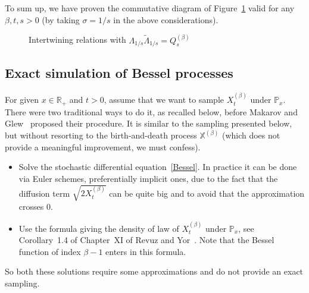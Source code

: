 \documentclass[10pt]{amsart}
\theoremstyle{definition}\newtheorem{defi}[theo]{Definition}\newtheorem{rema}[theo]{Remark}\newtheorem{exam}[theo]{Example}\newtheorem{exem}[theo]{Example}\newtheorem{nota}[theo]{Notation}
\newcommand{\cX}{{\discret X}}
\newcommand{\PP}{\mathbb{P}}
\newcommand{\RR}{\mathbb{R}}
\newcommand{\fm}{\mathfrak{m}}
\newcommand{\wi}{\widetilde}
\newcommand{\dBs}{{\discret{Q}}}
\newcommand{\Bs}{Q}
\newcommand{\esL}{\mathbf{L}}
\newcommand{\esLd}{\ell}
\newcommand{\discret}[1]{\mathds{#1}}
\begin{document}
To sum up, we have proven the commutative diagram of Figure~\ref{fig3} valid for any $\beta,t,s>0$ (by taking $\sigma=1/s$ in the above considerations).
\begin{figure}[ht]\centering
{}
\caption{Intertwining relations with $\Lambda_{1/s}\wi\Lambda_{1/s}=\Bs^{(\beta)}_s$}\label{fig3}
\end{figure}

\subsection{Exact simulation of Bessel processes}\label{Makarov}

For given $x\in\RR_+$ and $t>0$, assume that we want to sample $X^{(\beta)}_t$ under $\PP_x$. There were two traditional ways to do it, as recalled below, before Makarov and Glew~\cite{MR2747817} proposed their procedure. It is similar to the sampling presented below, but without resorting to the birth-and-death process $\cX^{(\beta)}$ (which does not provide a meaningful improvement, we must confess).
\begin{itemize}
\item Solve the stochastic differential equation~\eqref{Bessel}. In practice it can be done via Euler schemes, preferentially implicit ones, due to the fact that the diffusion term $\sqrt{2X^{(\beta)}_t}$ can be quite big and to avoid that the approximation crosses 0.
\item Use the formula giving the density of law of $X^{(\beta)}_t$ under $\PP_x$, see Corollary~1.4 of Chapter~XI of Revuz and Yor~\cite{MR1725357}. Note that the Bessel function of index $\beta-1$ enters in this formula.
\end{itemize}
So both these solutions require some approximations and do not provide an exact sampling.
\end{document}
